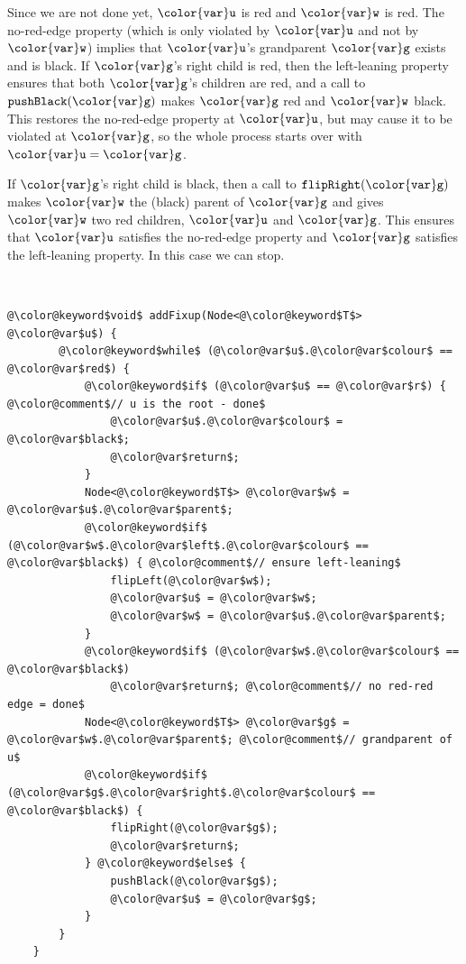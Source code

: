 \documentclass[10pt]{book}
\theoremstyle{plain}
\theoremstyle{definition}
\begin{document}
Since we are not done yet, \ensuremath{\mathtt{{\color{var}u}}} is red and \ensuremath{\mathtt{{\color{var}w}}} is red.  The no-red-edge
property (which is only violated by \ensuremath{\mathtt{{\color{var}u}}} and not by \ensuremath{\mathtt{{\color{var}w}}}) implies that
\ensuremath{\mathtt{{\color{var}u}}}'s grandparent \ensuremath{\mathtt{{\color{var}g}}} exists and is black.  If \ensuremath{\mathtt{{\color{var}g}}}'s right child is red,
then the left-leaning property ensures that both \ensuremath{\mathtt{{\color{var}g}}}'s children are red,
and a call to \ensuremath{\mathtt{pushBlack({\color{var}g})}} makes \ensuremath{\mathtt{{\color{var}g}}} red and \ensuremath{\mathtt{{\color{var}w}}} black.  This restores
the no-red-edge property at \ensuremath{\mathtt{{\color{var}u}}}, but may cause it to be violated at \ensuremath{\mathtt{{\color{var}g}}},
so the whole process starts over with $\ensuremath{\mathtt{{\color{var}u}}}=\ensuremath{\mathtt{{\color{var}g}}}$.

If \ensuremath{\mathtt{{\color{var}g}}}'s right child is black, then a call to \ensuremath{\mathtt{flipRight({\color{var}g})}} makes
\ensuremath{\mathtt{{\color{var}w}}} the (black) parent of \ensuremath{\mathtt{{\color{var}g}}} and gives \ensuremath{\mathtt{{\color{var}w}}} two red children, \ensuremath{\mathtt{{\color{var}u}}} and
\ensuremath{\mathtt{{\color{var}g}}}. This ensures that \ensuremath{\mathtt{{\color{var}u}}} satisfies the no-red-edge property and \ensuremath{\mathtt{{\color{var}g}}}
satisfies the left-leaning property.  In this case we can stop.


 \ \vspace{.5ex}\begin{Verbatim}[gobble=1,tabsize=2,frame=single,framerule=1.2pt,commandchars=\\@\$,label=\texttt{RedBlackTree},labelposition=topline]
	@\color@keyword$void$ addFixup(Node<@\color@keyword$T$> @\color@var$u$) {
		@\color@keyword$while$ (@\color@var$u$.@\color@var$colour$ == @\color@var$red$) {
			@\color@keyword$if$ (@\color@var$u$ == @\color@var$r$) { @\color@comment$// u is the root - done$
				@\color@var$u$.@\color@var$colour$ = @\color@var$black$;
				@\color@var$return$;
			}
			Node<@\color@keyword$T$> @\color@var$w$ = @\color@var$u$.@\color@var$parent$;
			@\color@keyword$if$ (@\color@var$w$.@\color@var$left$.@\color@var$colour$ == @\color@var$black$) { @\color@comment$// ensure left-leaning$
				flipLeft(@\color@var$w$);
				@\color@var$u$ = @\color@var$w$;
				@\color@var$w$ = @\color@var$u$.@\color@var$parent$;
			}
			@\color@keyword$if$ (@\color@var$w$.@\color@var$colour$ == @\color@var$black$)
				@\color@var$return$; @\color@comment$// no red-red edge = done$
			Node<@\color@keyword$T$> @\color@var$g$ = @\color@var$w$.@\color@var$parent$; @\color@comment$// grandparent of u$
			@\color@keyword$if$ (@\color@var$g$.@\color@var$right$.@\color@var$colour$ == @\color@var$black$) {
				flipRight(@\color@var$g$);
				@\color@var$return$;
			} @\color@keyword$else$ {
				pushBlack(@\color@var$g$);
				@\color@var$u$ = @\color@var$g$;
			}
		}
	}
\end{Verbatim}
\end{document}
